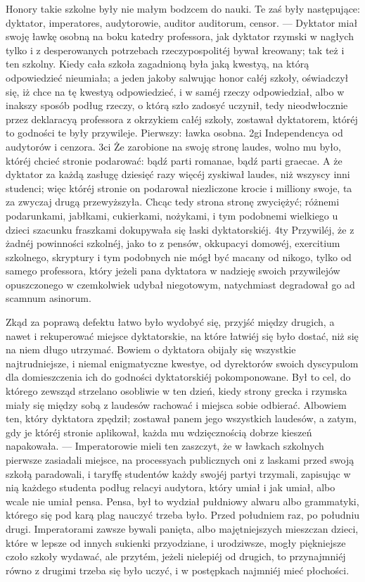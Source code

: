\documentclass{book}
\begin{document}
Honory takie szkolne były nie małym bodzcem do nauki. Te zaś były następujące: dyktator, imperatores, audytorowie, auditor auditorum, censor. — Dyktator miał swoję ławkę osobną na boku katedry professora, jak dyktator rzymski w nagłych tylko i z desperowanych potrzebach rzeczypospolitéj bywał kreowany; tak też i ten szkolny. Kiedy cała szkoła zagadnioną była jaką kwestyą, na którą odpowiedzieć nieumiała; a jeden jakoby salwując honor całéj szkoły, oświadczył się, iż chce na tę kwestyą odpowiedzieć, i w saméj rzeczy odpowiedział, albo w inakszy sposób podług rzeczy, o którą szło zadosyć uczynił, tedy nieodwłocznie przez deklaracyą professora z okrzykiem całéj szkoły, zostawał dyktatorem, któréj to godności te były przywileje. Pierwszy: ławka osobna. 2gi Independencya od audytorów i cenzora. 3ci Że zarobione na swoję stronę laudes, wolno mu było, któréj chcieć stronie podarować: bądź parti romanae, bądź parti graecae. A że dyktator za każdą zasługę dziesięć razy więcéj zyskiwał laudes, niż wszyscy inni studenci; więc któréj stronie on podarował niezliczone krocie i milliony swoje, ta za zwyczaj drugą przewyższyła. Chcąc tedy strona stronę zwyciężyć; różnemi podarunkami, jabłkami, cukierkami, nożykami, i tym podobnemi wielkiego u dzieci szacunku fraszkami dokupywała się łaski dyktatorskiéj. 4ty Przywiléj, że z żadnéj powinności szkolnéj, jako to z pensów, okkupacyi domowéj, exercitium szkolnego, skryptury i tym podobnych nie mógł być macany od nikogo, tylko od samego professora, który jeżeli pana dyktatora w nadzieję swoich przywilejów opuszczonego w czemkolwiek udybał niegotowym, natychmiast degradował go ad scamnum asinorum.

Zkąd za poprawą defektu łatwo było wydobyć się, przyjść między drugich, a nawet i rekuperować miejsce dyktatorskie, na które łatwiéj się było dostać, niż się na niem długo utrzymać. Bowiem o dyktatora obijały się wszystkie najtrudniejsze, i niemal enigmatyczne kwestye, od dyrektorów swoich dyscypulom dla domieszczenia ich do godności dyktatorskiéj pokomponowane. Był to cel, do którego zewsząd strzelano osobliwie w ten dzień, kiedy strony grecka i rzymska miały się między sobą z laudesów rachować i miejsca sobie odbierać. Albowiem ten, który dyktatora zpędził; zostawał panem jego wszystkich laudesów, a zatym, gdy je któréj stronie aplikował, każda mu wdzięcznością dobrze kieszeń napakowała. — Imperatorowie mieli ten zaszczyt, że w ławkach szkolnych pierwsze zasiadali miejsce, na processyach publicznych oni z laskami przed swoją szkołą paradowali, i taryffę studentów każdy swojéj partyi trzymali, zapisując w nią każdego studenta podług relacyi audytora, który umiał i jak umiał, albo wcale nie umiał pensa. Pensa, był to wydział pułdniowy alwaru albo grammatyki, którego się pod karą plag nauczyć trzeba było. Przed południem raz, po południu drugi. Imperatorami zawsze bywali panięta, albo majętniejszych mieszczan dzieci, które w lepsze od innych sukienki przyodziane, i urodziwsze, mogły piękniejsze czoło szkoły wydawać, ale przytém, jeżeli nielepiéj od drugich, to przynajmniéj równo z drugimi trzeba się było uczyć, i w postępkach najmniéj mieć płochości.
\end{document}
